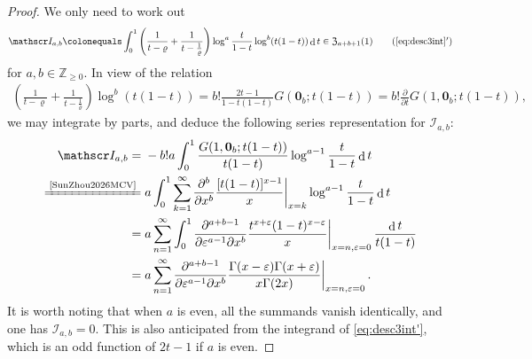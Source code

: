 \documentclass[final,notitlepage,12pt,reqno]{amsart}
\DeclareMathOperator{\D}{d}
\theoremstyle{plain}
\theoremstyle{definition}
\numberwithin{equation}{section}
\begin{document}
\begin{proof}We only need to work out \begin{align}
   \mathscr I_{a,b}\colonequals\int_0^1\left( \frac{1}{t-\varrho} +\frac{1}{t-\frac{1}{\varrho}} \right)\log^{a} \frac{t}{1-t} \log^{b}(t(1-t))\D t\in\mathfrak Z_{a+b+1}(1)\tag{\ref{eq:desc3int}$'$}\label{eq:desc3int'} 
\end{align}for $ a,b\in\mathbb Z_{\geq0}$. In view of the relation\begin{align}
\left( \frac{1}{t-\varrho} +\frac{1}{t-\frac{1}{\varrho}} \right)\log^{b}(t(1-t))=b!\frac{2t-1}{1-t(1-t)}G(\boldsymbol0_{b};t(1-t))=b!\frac{\partial}{\partial t}G(1,\boldsymbol0_{b};t(1-t)),
\end{align} we may integrate by parts, and deduce the following series representation for $ \mathscr I_{a,b}$:\begin{align}
\begin{split}\mathscr I_{a,b}={}&-b!a\int_{0}^1\frac{G(1,\boldsymbol0_{b};t(1-t))}{t(1-t)}\log^{a-1} \frac{t}{1-t}\D t\\\xlongequal{\text{\cite[\S2.2]{SunZhou2026MCV}}}{}& a\int_{0}^1\sum_{k=1}^\infty\left.\!\frac{\partial^{b}}{\partial x^{b}}\frac{[t(1-t)]^{x-1}}{x}\right|_{x=k}\log^{a-1} \frac{t}{1-t}\D t\\={}& a\sum_{n=1}^\infty\int_{0}^1\left.\!\frac{\partial^{a+b-1}}{\partial \varepsilon^{a-1}\partial x^{b}}\frac{t^{x+\varepsilon}(1-t)^{x-\varepsilon}}{x}\right|_{x=n,\varepsilon=0}\frac{\D t}{t(1-t)}\\={}& a\sum_{n=1}^{\infty}\left.\!\frac{\partial^{a+b-1}}{\partial \varepsilon^{a-1}\partial x^{b}}\frac{\Gamma (x-\varepsilon) \Gamma (x+\varepsilon )}{x \Gamma (2 x)}\right|_{x=n,\varepsilon=0}.
\end{split}
\end{align} It is worth noting that when $a$ is even, all the summands vanish identically, and one has $ \mathscr I_{a,b}=0$. This is also anticipated from  the integrand of \eqref{eq:desc3int'}, which is an odd function of $2t-1$ if $a $ is even. 


\end{proof}
\end{document}
